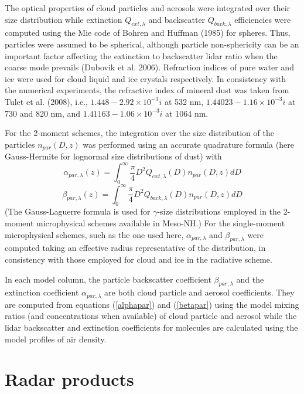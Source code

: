 The optical properties of cloud particles and aerosols were integrated over their size distribution while extinction $Q_{ext,\lambda}$ and backscatter $Q_{back,\lambda}$ efficiencies were computed using the Mie code of Bohren and Huffman (1985) for spheres. Thus, particles were assumed to be spherical, although particle non-sphericity can be an important factor affecting the extinction to backscatter lidar ratio when the coarse mode prevails (Dubovik et al. 2006). Refraction indices of pure water and ice were used for cloud liquid and ice crystals respectively. In consistency with the numerical experiments, the refractive index of mineral dust was taken from Tulet et al. (2008), i.e., $1.448-2.92 \times 10^{-3}i$ at 532 nm, $1.44023 - 1.16 \times 10^{-3}i$ at 730 and 820 nm, and $1.41163 - 1.06 \times 10^{-3}i$ at 1064 nm.

For the 2-moment schemes, the integration over the size distribution of the particles $n_{par}(D,z)$ was performed using an accurate quadrature formula (here Gauss-Hermite for lognormal size distributions of dust) with
\begin{equation} \label{alphapar}
\alpha_{par,\lambda}(z)=
\int_0^\infty\frac{\pi}{4}D^2 Q_{ext,\lambda}(D) n_{par}(D,z)dD
\end{equation}
\begin{equation} \label{betapar}
\beta_{par,\lambda}(z)=
\int_0^\infty\frac{\pi}{4}D^2 Q_{back,\lambda}(D) n_{par}(D,z)dD
\end{equation}
(The Gauss-Laguerre formula is used for $\gamma$-size distributions employed in the 2-moment microphysical schemes available in Meso-NH.) For the single-moment microphysical schemes, such as the one used here, $\alpha_{par,\lambda}$ and $\beta_{par,\lambda}$ were computed taking an effective radius representative of the distribution, in consistency with those employed for cloud and ice in the radiative scheme.

In each model column, the particle backscatter coefficient $\beta_{par,\lambda}$ and the extinction coefficient $\alpha_{par,\lambda}$ are both cloud particle and aerosol coefficients. They are computed from equations (\ref{alphapar}) and (\ref{betapar}) using the model mixing ratios (and concentrations when available) of cloud particle and aerosol while the lidar backscatter and extinction coefficients for molecules are calculated using the model profiles of air density.
%
\section{Radar products}
%
